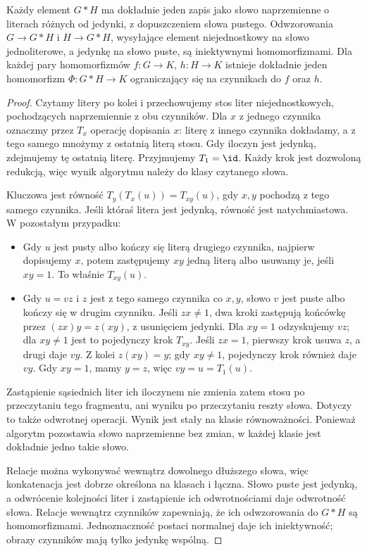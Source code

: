 \begin{stwierdzenie}
\label{prop:free-product-normal-5}
Każdy element $G*H$ ma dokładnie jeden zapis jako słowo
naprzemienne o literach różnych od jedynki, z dopuszczeniem
słowa pustego. Odwzorowania $G\to G*H$ i $H\to G*H$,
wysyłające element niejednostkowy na słowo jednoliterowe,
a jedynkę na słowo puste, są iniektywnymi homomorfizmami.
Dla każdej pary homomorfizmów $f:G\to K$, $h:H\to K$
istnieje dokładnie jeden homomorfizm $\Phi:G*H\to K$
ograniczający się na czynnikach do $f$ oraz $h$.
\end{stwierdzenie}
\begin{proof}
Czytamy litery po kolei i przechowujemy stos liter
niejednostkowych, pochodzących naprzemiennie z obu czynników.
Dla $x$ z jednego czynnika oznaczmy przez $T_x$ operację
dopisania $x$: literę z innego czynnika dokładamy, a z tego
samego mnożymy z ostatnią literą stosu. Gdy iloczyn jest
jedynką, zdejmujemy tę ostatnią literę. Przyjmujemy $T_1=\id$.
Każdy krok jest dozwoloną redukcją, więc wynik algorytmu
należy do klasy czytanego słowa.

Kluczowa jest równość $T_y(T_x(u))=T_{xy}(u)$, gdy $x,y$
pochodzą z tego samego czynnika. Jeśli któraś litera jest
jedynką, równość jest natychmiastowa. W pozostałym przypadku:
\begin{itemize}[leftmargin=*]
\item Gdy $u$ jest pusty albo kończy się literą drugiego
czynnika, najpierw dopisujemy $x$, potem zastępujemy $xy$
jedną literą albo usuwamy je, jeśli $xy=1$. To właśnie $T_{xy}(u)$.
\item Gdy $u=vz$ i $z$ jest z tego samego czynnika co $x,y$,
słowo $v$ jest puste albo kończy się w drugim czynniku.
Jeśli $zx\ne1$, dwa kroki zastępują końcówkę przez
$(zx)y=z(xy)$, z usunięciem jedynki. Dla $xy=1$ odzyskujemy $vz$;
dla $xy\ne1$ jest to pojedynczy krok $T_{xy}$.
Jeśli $zx=1$, pierwszy krok usuwa $z$, a drugi daje $vy$.
Z kolei $z(xy)=y$; gdy $xy\ne1$, pojedynczy krok również daje $vy$.
Gdy $xy=1$, mamy $y=z$, więc $vy=u=T_1(u)$.
\end{itemize}
Zastąpienie sąsiednich liter ich iloczynem nie zmienia zatem
stosu po przeczytaniu tego fragmentu, ani wyniku po przeczytaniu
reszty słowa. Dotyczy to także odwrotnej operacji.
Wynik jest stały na klasie równoważności. Ponieważ algorytm
pozostawia słowo naprzemienne bez zmian, w każdej klasie jest
dokładnie jedno takie słowo.

Relacje można wykonywać wewnątrz dowolnego dłuższego słowa,
więc konkatenacja jest dobrze określona na klasach i łączna.
Słowo puste jest jedynką, a odwrócenie kolejności liter
i zastąpienie ich odwrotnościami daje odwrotność słowa.
Relacje wewnątrz czynników zapewniają, że ich odwzorowania
do $G*H$ są homomorfizmami. Jednoznaczność postaci normalnej
daje ich iniektywność; obrazy czynników mają tylko jedynkę wspólną.


\end{proof}
